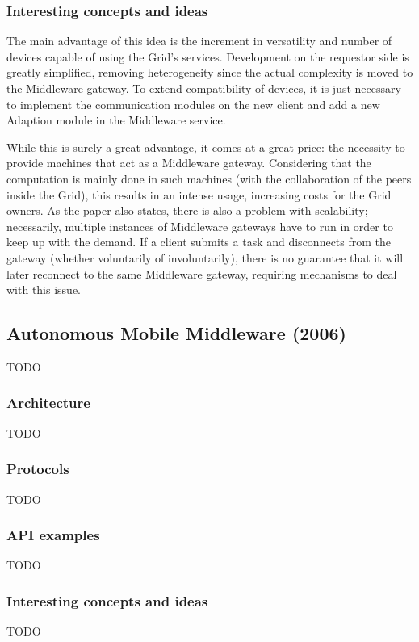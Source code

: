 \subsubsection{Interesting concepts and ideas}
The main advantage of this idea is the increment in versatility and number of devices capable of using the Grid's services. Development on the requestor side is greatly simplified, removing heterogeneity since the actual complexity is moved to the Middleware gateway. To extend compatibility of devices, it is just necessary to implement the communication modules on the new client and add a new Adaption module in the Middleware service.

While this is surely a great advantage, it comes at a great price: the necessity to provide machines that act as a Middleware gateway. Considering that the computation is mainly done in such machines (with the collaboration of the peers inside the Grid), this results in an intense usage, increasing costs for the Grid owners.
As the paper also states, there is also a problem with scalability; necessarily, multiple instances of Middleware gateways have to run in order to keep up with the demand. If a client submits a task and disconnects from the gateway (whether voluntarily of involuntarily), there is no guarantee that it will later reconnect to the same Middleware gateway, requiring mechanisms to deal with this issue.

\subsection{Autonomous Mobile Middleware (2006)}
TODO

\subsubsection{Architecture}
TODO

\subsubsection{Protocols}
TODO

\subsubsection{API examples}
TODO

\subsubsection{Interesting concepts and ideas}
TODO